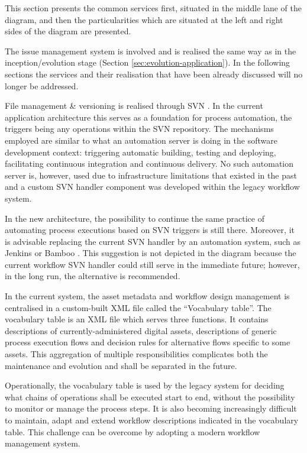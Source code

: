 	This section presents the common services first, situated in the middle lane of the diagram, and then the particularities which are situated at the left and right sides of the diagram are presented. 
	
	The issue management system is involved and is realised the same way as in the inception/evolution stage (Section \ref{sec:evolution-application}). In the following sections the services and their realisation that have been already discussed will no longer be addressed.  
	
	File management \& versioning is realised through SVN \cite{svn}. In the current application architecture this serves as a foundation for process automation, the triggers being any operations within the SVN repository. The mechanisms employed are similar to what an automation server is doing in the software development context: triggering automatic building, testing and deploying, facilitating continuous integration and continuous delivery. No such automation server is, however, used due to infrastructure limitations that existed in the past and a custom SVN handler component was developed within the legacy workflow system. 
	
	In the new architecture, the possibility to continue the same practice of automating process executions based on SVN triggers is still there. Moreover, it is advisable replacing the current SVN handler by an automation system, such as Jenkins \citep{jenkins} or Bamboo \cite{bamboo}. This suggestion is not depicted in the diagram because the current workflow SVN handler could still serve in the immediate future; however, in the long run, the alternative is recommended.
	
	In the current system, the asset metadata and workflow design management is centralised in a custom-built XML file called the ``Vocabulary table''. The vocabulary table is an XML file which serves three functions. It contains descriptions of currently-administered digital assets, descriptions of generic process execution flows and decision rules for alternative flows specific to some assets. This aggregation of multiple responsibilities complicates both the maintenance and evolution and shall be separated in the future. 
	
	Operationally, the vocabulary table is used by the legacy system for deciding what chains of operations shall be executed start to end, without the possibility to monitor or manage the process steps. It is also becoming increasingly difficult to maintain, adapt and extend workflow descriptions indicated in the vocabulary table. This challenge can be overcome by adopting a modern workflow management system. 
	
